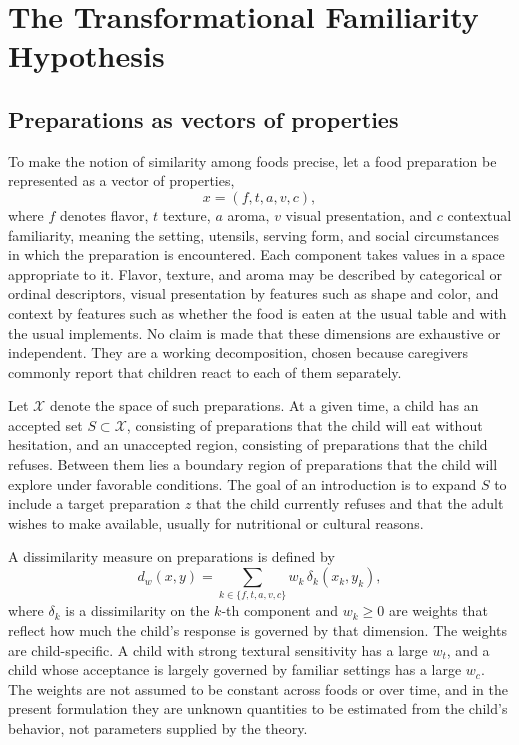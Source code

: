 \documentclass[11pt]{article}
\theoremstyle{remark}
\begin{document}
\section{The Transformational Familiarity Hypothesis}\label{sec:hypothesis}

\subsection{Preparations as vectors of properties}

To make the notion of similarity among foods precise, let a food preparation be represented as a vector of properties,
\begin{equation}
x = (f, t, a, v, c),
\end{equation}
where $f$ denotes flavor, $t$ texture, $a$ aroma, $v$ visual presentation, and $c$ contextual familiarity, meaning the setting, utensils, serving form, and social circumstances in which the preparation is encountered. Each component takes values in a space appropriate to it. Flavor, texture, and aroma may be described by categorical or ordinal descriptors, visual presentation by features such as shape and color, and context by features such as whether the food is eaten at the usual table and with the usual implements. No claim is made that these dimensions are exhaustive or independent. They are a working decomposition, chosen because caregivers commonly report that children react to each of them separately.

Let $\mathcal{X}$ denote the space of such preparations. At a given time, a child has an accepted set $S \subset \mathcal{X}$, consisting of preparations that the child will eat without hesitation, and an unaccepted region, consisting of preparations that the child refuses. Between them lies a boundary region of preparations that the child will explore under favorable conditions. The goal of an introduction is to expand $S$ to include a target preparation $z$ that the child currently refuses and that the adult wishes to make available, usually for nutritional or cultural reasons.

A dissimilarity measure on preparations is defined by
\begin{equation}
d_w(x, y) = \sum_{k \in \{f, t, a, v, c\}} w_k \, \delta_k(x_k, y_k),
\end{equation}
where $\delta_k$ is a dissimilarity on the $k$-th component and $w_k \geq 0$ are weights that reflect how much the child's response is governed by that dimension. The weights are child-specific. A child with strong textural sensitivity has a large $w_t$, and a child whose acceptance is largely governed by familiar settings has a large $w_c$. The weights are not assumed to be constant across foods or over time, and in the present formulation they are unknown quantities to be estimated from the child's behavior, not parameters supplied by the theory.
\end{document}

